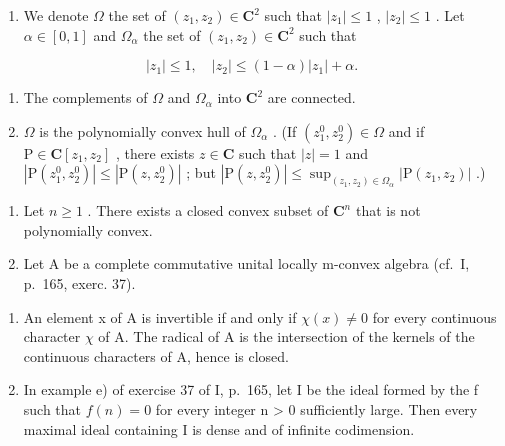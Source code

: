 \begin{enumerate}
\def\labelenumi{\arabic{enumi})}
\setcounter{enumi}{22}
\tightlist
\item
  We denote \(\Omega\) the set of \((z_1, z_2) \in \mathbf{C}^2\) such that \(|z_1| \leqslant 1\) , \(|z_2| \leqslant 1\) . Let \(\alpha \in [0,1]\) and \(\Omega_\alpha\) the set of \((z_1, z_2) \in \mathbf{C}^2\) such that
\end{enumerate}

\[
| z _ {1} | \leqslant 1, \quad | z _ {2} | \leqslant (1 - \alpha) | z _ {1} | + \alpha .
\]

\begin{enumerate}
\def\labelenumi{\alph{enumi})}
\item
  The complements of \(\Omega\) and \(\Omega_{\alpha}\) into \(\mathbf{C}^2\) are connected.
\item
  \(\Omega\) is the polynomially convex hull of \(\Omega_{\alpha}\) . (If \((z_1^0, z_2^0) \in \Omega\) and if \(\mathrm{P} \in \mathbf{C}[z_1, z_2]\) , there exists \(z \in \mathbf{C}\) such that \(|z| = 1\) and \(|\mathrm{P}(z_1^0, z_2^0)| \leqslant |\mathrm{P}(z, z_2^0)|\) ; but \(|\mathrm{P}(z, z_2^0)| \leqslant \sup_{(z_1, z_2) \in \Omega_{\alpha}} |\mathrm{P}(z_1, z_2)|\) .)
\end{enumerate}

\begin{enumerate}
\def\labelenumi{\arabic{enumi})}
\setcounter{enumi}{23}
\item
  Let \(n \geqslant 1\) . There exists a closed convex subset of \(\mathbf{C}^{n}\) that is not polynomially convex.
\item
  Let A be a complete commutative unital locally m-convex algebra (cf.~I, p.~165, exerc. 37).
\end{enumerate}

\begin{enumerate}
\def\labelenumi{\alph{enumi})}
\item
  An element x of A is invertible if and only if \(\chi(x) \neq 0\) for every continuous character \(\chi\) of A. The radical of A is the intersection of the kernels of the continuous characters of A, hence is closed.
\item
  In example e) of exercise 37 of I, p.~165, let I be the ideal formed by the f such that \(f(n) = 0\) for every integer n \textgreater{} 0 sufficiently large. Then every maximal ideal containing I is dense and of infinite codimension.
\end{enumerate}

